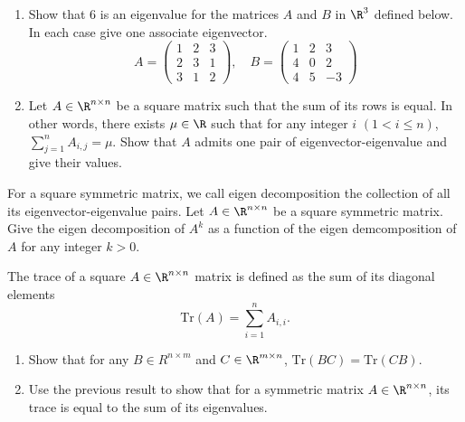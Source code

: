 \documentclass[11pt,nocut]{article}
\begin{document}



\begin{problem}[2 points]
    
    \begin{enumerate}[label=\normalfont(\textbf{\alph*})]
        \item Show that 6 is an eigenvalue for the matrices $A$ and $B$ in $\R^3$ defined below. In each case give one associate eigenvector.
        $$
        A = \begin{pmatrix}
            1 & 2 & 3\\
            2 & 3 & 1\\
            3 & 1 & 2
        \end{pmatrix} , \quad
        B = \begin{pmatrix}
            1 & 2 & 3\\
            4 & 0 & 2\\
            4 & 5 & -3
        \end{pmatrix} 
        $$
        \item Let $A \in \R^{n \times n}$ be a square matrix such that the sum of its rows is equal. In other words, there exists $\mu \in \R$ such that for any integer $i$ $(1 < i \leq n)$, $\sum_{j=1}^n A_{i,j} = \mu$. Show that $A$ admits one pair of eigenvector-eigenvalue and give their values. 
    \end{enumerate}
\end{problem}

\vspace{1cm}

\begin{problem}[2 points]
    For a square symmetric matrix, we call eigen decomposition the collection of all its eigenvector-eigenvalue pairs. Let $A\in \R^{n\times n}$ be a square symmetric matrix. Give the eigen decomposition of $A^k$ as a function of the eigen demcomposition of $A$ for any integer $k > 0$.
\end{problem}

\vspace{1cm}

\begin{problem}[2 points]
    The trace of a square $A\in \R^{n\times n}$ matrix is defined as the sum of its diagonal elements
    $$
    \mathrm{Tr}(A) = \sum_{i=1}^n A_{i,i}.
    $$
    \begin{enumerate}[label=\normalfont(\textbf{\alph*})]
        \item Show that for any $B \in R^{n \times m}$ and $C \in \R^{m \times n}$, $\mathrm{Tr}(BC) = \mathrm{Tr}(CB)$.
        \item Use the previous result to show that for a symmetric matrix $A\in \R^{n\times n}$, its trace is equal to the sum of its eigenvalues.
    \end{enumerate}
\end{problem}
\end{document}
